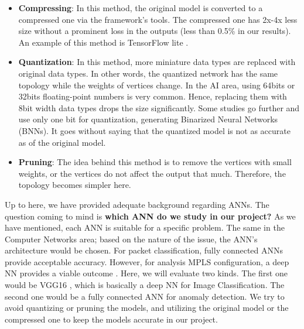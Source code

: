 \begin{itemize}
  \item \textbf{Compressing}: In this method, the original model is converted to a compressed one via the framework's tools. The compressed one has 2x-4x less size without a prominent loss in the outputs (less than 0.5\% in our results). An example of this method is TensorFlow lite \cite{tflite}.
  \item  \textbf{Quantization}: In this method, more miniature data types are replaced with original data types. In other words, the quantized network has the same topology while the weights of vertices change. In the AI area, using 64bits or 32bits floating-point numbers is very common.  Hence, replacing them with 8bit width data types drops the size significantly. Some studies go further and use only one bit for quantization, generating Binarized Neural Networks (BNNs). It goes without saying that the quantized model is not as accurate as of the original model.
  \item  \textbf{Pruning}: The idea behind this method is to remove the vertices with small weights, or the vertices do not affect the output that much. Therefore, the topology becomes simpler here.
\end{itemize}

Up to here, we have provided adequate background regarding ANNs. The question coming to mind is \textbf{which ANN do we study in our project?}
As we have mentioned, each ANN is suitable for a specific problem. The same in the Computer Networks area; based on the nature of the issue, the ANN's architecture would be chosen. For packet classification, fully connected ANNs provide acceptable accuracy. However, for analysis MPLS configuration, a deep NN provides a viable outcome \cite{8999396}. Here, we will evaluate two kinds. The first one would be VGG16 \cite{simonyan2014very}, which is basically a deep NN for Image Classification. The second one would be a fully connected ANN for anomaly detection. We try to avoid quantizing or pruning the models, and utilizing the original model or the compressed one to keep the models accurate in our project.